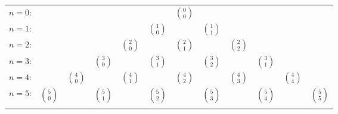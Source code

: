 \begin{tabular}{rccccccccccc}
  $n=0$:&    &    &    &    &    &  $\binom{0}{0}$ \\\noalign{\smallskip\smallskip}
  $n=1$:&    &    &    &    &  $\binom{1}{0}$ &    &  $\binom{1}{1}$ \\\noalign{\smallskip\smallskip}
  $n=2$:&    &    &    &  $\binom{2}{0}$ &    &  $\binom{2}{1}$ &    &  $\binom{2}{2}$ \\\noalign{\smallskip\smallskip}
  $n=3$:&    &    &  $\binom{3}{0}$ &    &  $\binom{3}{1}$ &    &  $\binom{3}{2}$ &    & $\binom{3}{1}$ \\\noalign{\smallskip\smallskip}
  $n=4$:&    &  $\binom{4}{0}$ &    &  $\binom{4}{1}$ &    &  $\binom{4}{2}$ &    & $\binom{4}{3}$ &    & $\binom{4}{4}$ \\\noalign{\smallskip\smallskip}
  $n=5$:& $\binom{5}{0}$ &    &  $\binom{5}{1}$ &    & $\binom{5}{2}$ &    & $\binom{5}{3}$ &    & $\binom{5}{4}$ &    &  $\binom{5}{5}$\\\noalign{\smallskip\smallskip}
\end{tabular}
